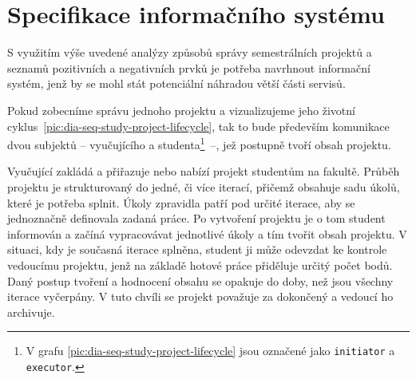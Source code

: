 \chapter{Specifikace informačního systému}

S využitím výše uvedené analýzy způsobů správy semestrálních projektů a seznamů pozitivních a negativních prvků je potřeba navrhnout informační systém, jenž by se mohl stát potenciální náhradou větší části servisů. 

Pokud zobecníme správu jednoho projektu a vizualizujeme jeho životní
cyklus~\ref{pic:dia-seq-study-project-lifecycle}, tak to bude především komunikace dvou subjektů -- vyučujícího a studenta\footnote{V grafu \ref{pic:dia-seq-study-project-lifecycle} jsou označené jako \texttt{initiator} a \texttt{executor}.}~--, jež postupně tvoří obsah projektu.

Vyučující zakládá a přiřazuje nebo nabízí projekt studentům na fakultě. Průběh projektu je strukturovaný do jedné, či více iterací, přičemž obsahuje sadu úkolů, které je potřeba splnit. Úkoly zpravidla patří pod určité iterace, aby se jednoznačně definovala zadaná práce. Po vytvoření projektu je o tom student informován a začíná vypracovávat jednotlivé úkoly a tím tvořit obsah projektu. V situaci, kdy je současná iterace splněna, student ji může odevzdat ke kontrole vedoucímu projektu, jenž na základě hotové práce přiděluje určitý počet bodů. Daný postup tvoření a hodnocení obsahu se opakuje do doby, než jsou všechny iterace vyčerpány. V tuto chvíli se projekt považuje za dokončený a vedoucí ho archivuje.


